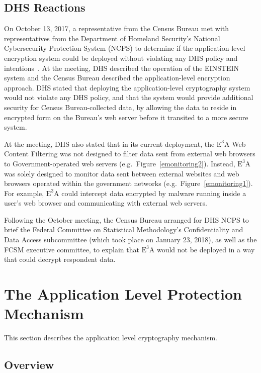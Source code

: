 \documentclass[fleqn,10pt]{wlscirep}
\newcommand{\ETA}{$\textrm{E}^\textrm{3}\textrm{A}$\xspace}
\begin{document}
\subsection{DHS Reactions}

On October 13, 2017, a representative from the Census Bureau met with
representatives from the Department of Homeland Security's National
Cybersecurity Protection System (NCPS) to determine if the
application-level encryption system could be deployed without
violating any DHS policy and intentions~\cite{garfinkel-notes}. At the meeting, DHS
described the operation of the EINSTEIN system and the Census Bureau
described the application-level encryption approach. DHS stated that
deploying the application-level cryptography system would not violate
any DHS policy, and that the system
would provide additional security for Census Bureau-collected data, by
allowing the data to reside in encrypted form on the Bureau's web
server before it transited to a more secure system.

At the meeting, DHS also stated that in its current deployment, the \ETA Web Content Filtering
was not designed to filter data sent from external web browsers to
Government-operated web servers (e.g.~Figure~\ref{emonitoring2}). Instead, \ETA was solely designed to
monitor data sent between external websites and web browsers operated
within the government networks (e.g.~Figure~\ref{emonitoring1}). For example, \ETA could intercept data
encrypted by malware running inside a user's web browser and
communicating with external web servers.

Following the October meeting, the Census Bureau arranged for DHS NCPS
to brief the Federal Committee on Statistical Methodology's
Confidentiality and Data Access subcommittee (which took place on
January 23, 2018), as well as the FCSM executive committee, to explain
that \ETA would not be deployed in a way that could decrypt respondent data.

\section{The Application Level Protection Mechanism}

This section describes the application level cryptography mechanism.

\subsection{Overview}
\end{document}
